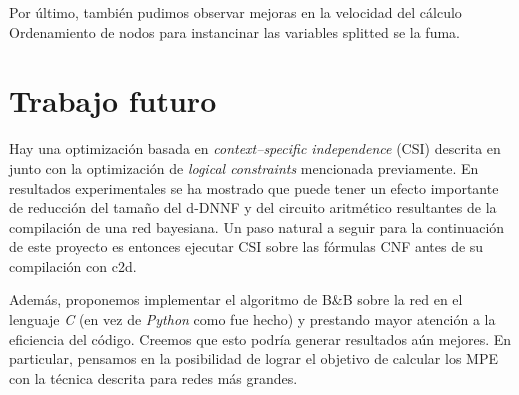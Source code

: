 \documentclass[11pt, letterpaper]{article}
\begin{document}
Por último, también pudimos observar mejoras en la velocidad del cálculo
Ordenamiento de nodos para instancinar las variables splitted se la fuma.


\section{Trabajo futuro}

Hay una optimización basada en \emph{context–specific independence} (CSI)
descrita en
\cite{Darwiche01alogical} junto con la optimización de \emph{logical constraints}
mencionada previamente. En resultados experimentales se ha mostrado que puede
tener un efecto importante de reducción del tamaño del d-DNNF y del circuito
aritmético resultantes de la compilación de una red bayesiana. Un paso natural a
seguir para la continuación de este proyecto es entonces ejecutar CSI sobre las
fórmulas CNF antes de su compilación con c2d.

Además, proponemos implementar el algoritmo de B\&B sobre la red en el
lenguaje \emph{C} (en vez de \emph{Python} como fue hecho) y prestando mayor
atención a la eficiencia del código. Creemos
que esto podría generar resultados aún mejores. En particular, pensamos en la
posibilidad de lograr el objetivo de calcular los MPE con la técnica descrita
para redes más grandes.



\end{document}
